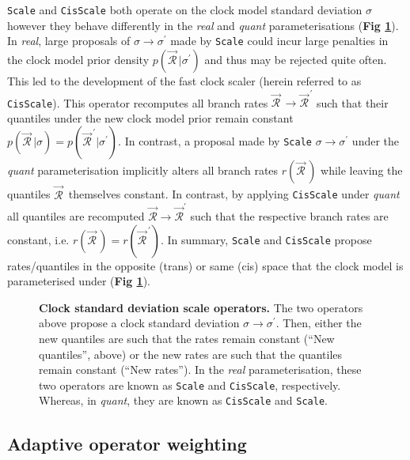 \documentclass[10pt,letterpaper]{article}
\begin{document}
 \texttt{Scale} and \texttt{CisScale} both operate on the clock model standard deviation $\sigma$ however they behave differently in the \textit{real} and \textit{quant} parameterisations (\textbf{Fig \ref{fig:clockSDoperators}}).
In \textit{real}, large proposals of $\sigma \rightarrow \sigma^\prime$ made by  \texttt{Scale} could incur large penalties in the clock model prior density $p(\vec{\mathcal{R}}^{\,}|\sigma^\prime)$ and thus may be rejected quite often. 
This led to the development of the fast clock scaler \cite{zhang2020improving} (herein referred to as \texttt{CisScale}).
This operator recomputes all branch rates $\vec{\mathcal{R}}^{\,} \rightarrow \vec{\mathcal{R}}^{\, \prime}$ such that their quantiles under the new clock model prior remain constant $p(\vec{\mathcal{R}}^{\,}|\sigma) = p(\vec{\mathcal{R}}^{\, \prime}|\sigma^\prime)$.
In contrast, a proposal made by \texttt{Scale} $\sigma \rightarrow \sigma^\prime$ under the \textit{quant} parameterisation implicitly alters all branch rates $r(\vec{\mathcal{R}}^{\,})$ while leaving the quantiles $\vec{\mathcal{R}}^{\,}$ themselves constant.
In contrast, by applying \texttt{CisScale} under \textit{quant}
all quantiles are recomputed $\vec{\mathcal{R}} \rightarrow \vec{\mathcal{R}}^\prime$  such that the respective branch rates are constant, i.e. $r(\vec{\mathcal{R}}^{\,}) = r(\vec{\mathcal{R}}^{\,\prime})$.
In summary, \texttt{Scale} and \texttt{CisScale} propose rates/quantiles in the opposite (trans) or same (cis) space that the clock model is parameterised under (\textbf{Fig \ref{fig:clockSDoperators}}).




\begin{figure}[!h]
\centering
\caption{\textbf{Clock standard deviation scale operators.}
The two operators above propose a clock standard deviation $\sigma \rightarrow \sigma^\prime$. 
Then, either the new quantiles are such that the rates remain constant (``New quantiles'', above) or the new rates are  such that the quantiles remain constant (``New rates''). 
In the \textit{real} parameterisation, these two operators are known as \texttt{Scale} and \texttt{CisScale}, respectively.
Whereas, in \textit{quant}, they are known as \texttt{CisScale} and \texttt{Scale}.    }
\label{fig:clockSDoperators}
\end{figure}



\clearpage
\subsection*{Adaptive operator weighting}
\label{sect:adaptiveSampling}
\end{document}
